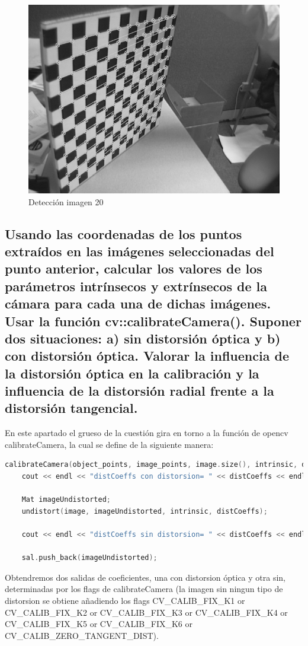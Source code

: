 \begin{figure}[H]
	\centering
	\includegraphics[width=0.7\linewidth]{ej2-4}
	\caption{Detección imagen 20}
\end{figure}


\subsection{Usando las coordenadas de los puntos extraídos en las imágenes seleccionadas del punto anterior, calcular los valores de los parámetros intrínsecos y extrínsecos de la cámara para cada una de dichas imágenes. Usar la función cv::calibrateCamera(). Suponer dos situaciones: a) sin distorsión óptica y b) con distorsión óptica. Valorar la influencia de la distorsión óptica en la calibración y la influencia de la distorsión radial frente a la distorsión tangencial.}

En este apartado el grueso de la cuestión gira en torno a la función de opencv calibrateCamera, la cual se define de la siguiente manera:

\begin{lstlisting}[language=C]
	calibrateCamera(object_points, image_points, image.size(), intrinsic, distCoeffs, rvecs, tvecs, [FLAGS]);
	cout << endl << "distCoeffs con distorsion= " << distCoeffs << endl << endl;
	
	Mat imageUndistorted;
	undistort(image, imageUndistorted, intrinsic, distCoeffs);
	
	cout << endl << "distCoeffs sin distorsion= " << distCoeffs << endl << endl;
	
	sal.push_back(imageUndistorted);
\end{lstlisting}

Obtendremos dos salidas de coeficientes, una con distorsion óptica y otra sin, determinadas por los flags de calibrateCamera (la imagen sin ningun tipo de distorsion se obtiene añadiendo los flags CV\_CALIB\_FIX\_K1 or CV\_CALIB\_FIX\_K2 or CV\_CALIB\_FIX\_K3 or CV\_CALIB\_FIX\_K4 or CV\_CALIB\_FIX\_K5 or CV\_CALIB\_FIX\_K6 or\\ CV\_CALIB\_ZERO\_TANGENT\_DIST).

